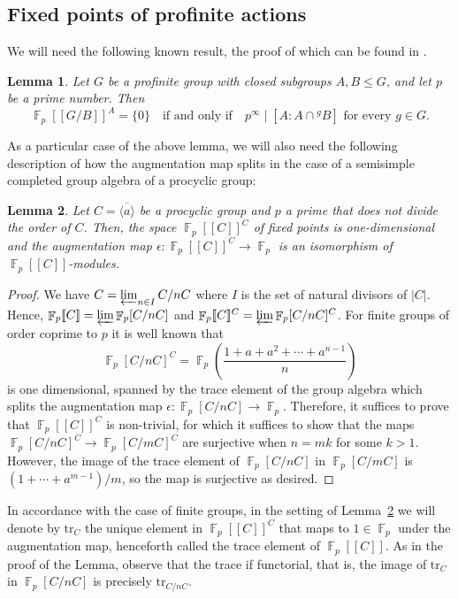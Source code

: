 \documentclass[a4paper]{amsart}
\newtheorem{lem}{Lemma}[section]
\theoremstyle{definition}
\theoremstyle{remark}
\DeclareMathOperator{\bbf}{\mathbb{F}}
\newcommand{\Falgebra}[1]{\bbf_p[#1]}
\newcommand{\FFalgebra}[1]{\bbf_p[\![#1]\!]}
\begin{document}
\subsection{Fixed points of profinite actions}

We will need the following known result, the proof of which can be found in \cite[Lem 2.2]{garridoFreeFactorsProfinite2023}.

\begin{lem}\label{fixedpoints}
Let \(G\) be a profinite group with closed subgroups \(A, B \leq G\), and let \(p\) be a prime number. Then \[\FFalgebra{G/B}^A = \{0\} \quad \text{if and only if} \quad p^\infty \mid [A : A \cap {^gB}] \text{ for every } g \in G.\]
\end{lem}

As a particular case of the above lemma, we will also need the following description of how the augmentation map splits in the case of a semisimple completed group algebra of a procyclic group:

\begin{lem}\label{lem-splitting-augmentation} Let \(C = \overline{\langle a \rangle}\) be a procyclic group and \(p\) a prime that does not divide the order of \(C\). Then, the space \(\FFalgebra{C}^C\) of fixed points is one-dimensional and the augmentation map \(\epsilon\colon \FFalgebra{C}^C \to \bbf_p\) is an isomorphism of \(\FFalgebra{C}\)-modules.
\end{lem}
\begin{proof} We have \(C = \varprojlim_{n \in I} C/nC\) where \(I\) is the set of natural divisors of \(|C|\). Hence, \(\FFalgebra{C} = \varprojlim \Falgebra{C/nC}\) and \(\FFalgebra{C}^C = \varprojlim \Falgebra{C/nC}^C\). For finite groups of order coprime to \(p\) it is well known that \[\Falgebra{C/nC}^C = \bbf_p\left(\frac{1 + a + a^2 + \cdots +a^{n-1}}{n}\right)\] is one dimensional, spanned by the trace element of the group algebra which splits the augmentation map \(\epsilon\colon \Falgebra{C/nC} \to \bbf_p\). Therefore, it suffices to prove that \(\FFalgebra{C}^C\) is non-trivial, for which it suffices to show that the maps \(\Falgebra{C/nC}^C \to \Falgebra{C/mC}^C\) are surjective when \(n = mk\) for some \(k > 1\). However, the image of the trace element of \(\Falgebra{C/nC}\) in \(\Falgebra{C/mC}\) is \((1+\cdots+a^{m-1})/m\), so the map is surjective as desired.
\end{proof}

In accordance with the case of finite groups, in the setting of Lemma~\ref{lem-splitting-augmentation} we will denote by \(\mathrm{tr}_C\) the unique element in \(\FFalgebra{C}^C\) that maps to \(1 \in \bbf_p\) under the augmentation map, henceforth called the trace element of \(\FFalgebra{C}\). As in the proof of the Lemma, observe that the trace if functorial, that is, the image of \(\mathrm{tr}_C\) in \(\Falgebra{C/nC}\) is precisely \(\mathrm{tr}_{C/nC}\).
\end{document}
